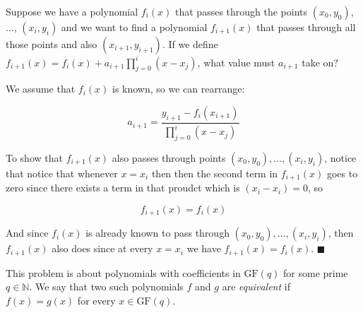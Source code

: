 \documentclass[11pt]{article}
\begin{document}
\begin{Parts}
	
	\Part Suppose we have a polynomial $f_i(x)$ that passes through the points $(x_0, y_0)$, ..., $(x_i, y_i)$ and we want to find a polynomial $f_{i + 1}(x)$ that passes through all those points and also $(x_{i + 1}, y_{i + 1})$.  If we define $f_{i + 1}(x) = f_i(x) + a_{i + 1}\prod_{j = 0}^i (x - x_j)$, what value must $a_{i + 1}$ take on?
	

    \begin{solution}
        We assume that $f_i(x)$ is known, so we can rearrange:

        \[ a_{i+1} = \frac{y_{i+1} - f_i(x_{i+1})}{\prod_{j = 0}^i (x - x_j)}\]

        To show that $f_{i+1}(x)$ also passes through points $(x_0, y_0), \dots,(x_i, y_i)$, notice that notice that whenever $x = x_i$ then then the second term in $f_{i+1}(x)$ goes to zero since there exists a term in that proudct which is $(x_i - x_i) = 0$, so 

        \[ f_{i+1}(x) = f_i(x)\] 

        And since $f_i(x)$ is already known to pass through $(x_0, y_0), \dots, (x_i, y_i)$, then $f_{i+1}(x)$ also does since at every $x = x_i$ we have $f_{i+1}(x) = f_i(x)$. $\blacksquare$

    \end{solution}
	
\end{Parts}
\pagebreak


This problem is about polynomials with coefficients in $\text{GF}(q)$ for some prime $q \in \mathbb{N}$. We say that two such polynomials $f$ and $g$ are \emph{equivalent} if $f(x) = g(x)$ for every $x \in \text{GF}(q)$.
\end{document}
